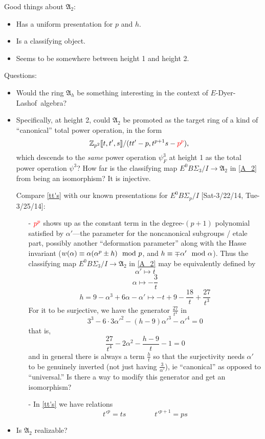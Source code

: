 \documentclass{rs}
\theoremstyle{definition}
\theoremstyle{remark}
\newcommand{\mb}[1]{\mathbb{#1}}
\newcommand{\mf}[1]{\mathfrak{#1}}
\newcommand{\DL}{Dyer-Lashof~}
\newcommand{\BZ}{{\mb Z}}
\newcommand{\md}{~~{\rm mod}~}
\newcommand{\A}{\alpha}
\newcommand{\p}{\psi^3}
\numberwithin{equation}{section}
\numberwithin{thm}{section}
\begin{document}
Good things about $\mf A_2$: 
\begin{itemize}
 \item Has a uniform presentation for $p$ and $h$.  

 \item Is a classifying object.  

 \item Seems to be somewhere between height 1 and height 2.  
\end{itemize}

Questions: 
\begin{itemize}
 \item Would the ring $\mf A_h$ be something interesting in the context of $E$-\DL algebra?  

 \item Specifically, at height 2, could $\mf A_2$ be promoted as the target ring of a kind of ``canonical'' total power operation, 
 in the form 
 \begin{equation}
 \label{tt's}
  \BZ_{p^2} \llbracket t, t', s \rrbracket / (t t' - p, t^{p+1} s - \textcolor{red}{p^p}), 
 \end{equation}
 which descends to the {\em same} power operation $\p_F$ at height 1 as the total power operation $\p$?  
 How far is the classifying map $E^0 B\Sigma_3 / I \to {\mf A_2}$ in \eqref{A_2} from being an isomorphism?  
 It is injective.  

 Compare \eqref{tt's} with our known presentations for $E^0 B\Sigma_p / I$ [Sat-3/22/14, Tue-3/25/14]: 
 \begin{itemize}
  \item[-] $\textcolor{red}{p^p}$ shows up as the constant term in the degree-$(p+1)$ polynomial 
  satisfied by $\A'$---the parameter for the noncanonical subgroups / etale part, 
  possibly another ``deformation parameter'' along with the Hasse invariant 
  ($w(\A) \equiv \A (\A^p \pm h) \md p$, and $h \equiv \mp \A' \md \A$).  
  Thus the classifying map $E^0 B\Sigma_3 / I \to {\mf A_2}$ in \eqref{A_2} may be equivalently defined by 
  \[
   \A' \mapsto t 
  \]
  \[
   \A \mapsto -\frac{3}{t} 
  \]
  \[
   h = 9 - \A^3 + 6 \A - \A' \mapsto -t + 9 - \frac{18}{t} + \frac{27}{t^3} 
  \]
  For it to be surjective, we have the generator $\frac{27}{t^4}$ in 
  \[
   3^3 - 6 \cdot 3 \A'^2 - (h - 9) \A'^3 - \A'^4 = 0 
  \]
  that is, 
  \[
   \frac{27}{t^4} - 2 \A^2 - \frac{h - 9}{t} - 1 = 0 
  \]
  and in general there is always a term $\frac{h}{t}$ 
  so that the surjectivity needs $\A'$ to be genuinely inverted 
  (not just having $\frac{3}{\A'}$), ie ``canonical'' as opposed to ``universal.''  
  Is there a way to modify this generator and get an isomorphism?  

  \item[-] In \eqref{tt's} we have relations 
  \[
   t'^p = t s \qquad\qquad t'^{p+1} = p s 
  \]
 \end{itemize}

 \item Is $\mf A_2$ realizable?  
\end{itemize}
\end{document}
